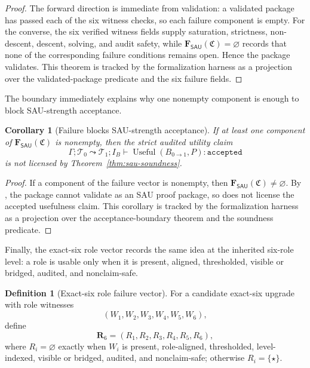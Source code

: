 \documentclass[11pt]{article}
\newcommand{\SAU}{\mathsf{SAU}}
\newcommand{\Use}{\operatorname{Useful}}
\newtheorem{corollary}[theorem]{Corollary}
\theoremstyle{definition}
\newtheorem{definition}[theorem]{Definition}
\begin{document}
\begin{proof}
The forward direction is immediate from validation: a validated package has
passed each of the six witness checks, so each failure component is empty.  For
the converse, the six verified witness fields supply saturation, strictness,
non-descent, descent, solving, and audit safety, while
\(\mathbf F_{\SAU}(\mathfrak C)=\varnothing\) records that none of the
corresponding failure conditions remains open.  Hence the package validates.
This theorem is tracked by the formalization harness as a projection over the
validated-package predicate and the six failure fields.
\end{proof}

The boundary immediately explains why one nonempty component is enough to block
SAU-strength acceptance.

\begin{corollary}[Failure blocks SAU-strength acceptance]
\label{cor:sau-failure-blocks-acceptance}
If at least one component of \(\mathbf F_{\SAU}(\mathfrak C)\) is nonempty, then the strict audited utility claim
\[
\Gamma;\mathcal T_0\leadsto\mathcal T_1;I_B\vdash
\Use(B_{0\to1},P):\texttt{accepted}
\]
is not licensed by Theorem~\ref{thm:sau-soundness}.
\end{corollary}

\begin{proof}
If a component of the failure vector is nonempty, then
\(\mathbf F_{\SAU}(\mathfrak C)\neq\varnothing\).  By
, the package cannot validate as an SAU proof
package, so  does not license the accepted usefulness
claim.  This corollary is tracked by the formalization harness as a projection
over the acceptance-boundary theorem and the soundness predicate.
\end{proof}

Finally, the exact-six role vector records the same idea at the inherited
six-role level: a role is usable only when it is present, aligned, thresholded,
visible or bridged, audited, and nonclaim-safe.

\begin{definition}[Exact-six role failure vector]
\label{def:sau-exact-six-failure-vector}
For a candidate exact-six upgrade with role witnesses
\[
(W_1,W_2,W_3,W_4,W_5,W_6),
\]
define
\[
\mathbf R_6=(R_1,R_2,R_3,R_4,R_5,R_6),
\]
where \(R_i=\varnothing\) exactly when \(W_i\) is present, role-aligned, thresholded, level-indexed, visible or bridged, audited, and nonclaim-safe; otherwise \(R_i=\{\star\}\).
\end{definition}
\end{document}
